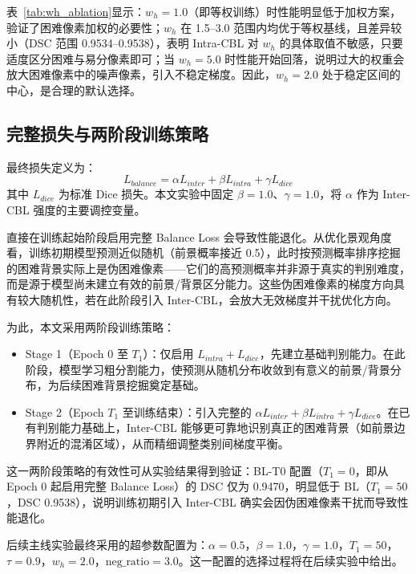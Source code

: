 表~\ref{tab:wh_ablation}显示：$w_h{=}1.0$（即等权训练）时性能明显低于加权方案，验证了困难像素加权的必要性；$w_h$ 在 1.5--3.0 范围内均优于等权基线，且差异较小（DSC 范围 0.9534--0.9538），表明 Intra-CBL 对 $w_h$ 的具体取值不敏感，只要适度区分困难与易分像素即可；当 $w_h{=}5.0$ 时性能开始回落，说明过大的权重会放大困难像素中的噪声像素，引入不稳定梯度。因此，$w_h{=}2.0$ 处于稳定区间的中心，是合理的默认选择。

\subsection{完整损失与两阶段训练策略}

最终损失定义为：
\begin{equation}
L_{balance}=\alpha L_{inter}+\beta L_{intra}+\gamma L_{dice}
\end{equation}
其中 $L_{dice}$ 为标准 Dice 损失\cite{milletari2016vnet}。本文实验中固定 $\beta=1.0$、$\gamma=1.0$，将 $\alpha$ 作为 Inter-CBL 强度的主要调控变量。

直接在训练起始阶段启用完整 Balance Loss 会导致性能退化。从优化景观角度看，训练初期模型预测近似随机（前景概率接近 0.5），此时按预测概率排序挖掘的困难背景实际上是伪困难像素——它们的高预测概率并非源于真实的判别难度，而是源于模型尚未建立有效的前景/背景区分能力。这些伪困难像素的梯度方向具有较大随机性，若在此阶段引入 Inter-CBL，会放大无效梯度并干扰优化方向。

为此，本文采用两阶段训练策略：
\begin{itemize}
  \item Stage 1（Epoch 0 至 $T_1$）：仅启用 $L_{intra}+L_{dice}$，先建立基础判别能力。在此阶段，模型学习粗分割能力，使预测从随机分布收敛到有意义的前景/背景分布，为后续困难背景挖掘奠定基础。
  \item Stage 2（Epoch $T_1$ 至训练结束）：引入完整的 $\alpha L_{inter}+\beta L_{intra}+\gamma L_{dice}$。在已有判别能力基础上，Inter-CBL 能够更可靠地识别真正的困难背景（如前景边界附近的混淆区域），从而精细调整类别间梯度平衡。
\end{itemize}

这一两阶段策略的有效性可从实验结果得到验证：BL-T0 配置（$T_1{=}0$，即从 Epoch 0 起启用完整 Balance Loss）的 DSC 仅为 0.9470，明显低于 BL（$T_1{=}50$，DSC 0.9538），说明训练初期引入 Inter-CBL 确实会因伪困难像素干扰而导致性能退化。

后续主线实验最终采用的超参数配置为：$\alpha = 0.5$，$\beta = 1.0$，$\gamma = 1.0$，$T_1 = 50$，$\tau = 0.9$，$w_h = 2.0$，$\text{neg\_ratio} = 3.0$。这一配置的选择过程将在后续实验中给出。

